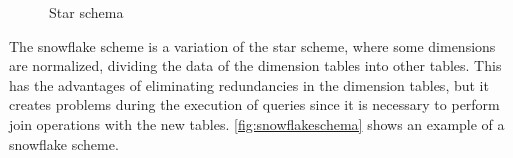 \begin{figure}[!htb]
  \caption{Star schema}\label{fig:starschema}
  \vspace{6mm}
  \begin{center}
  \end{center}
  \vspace{1mm}
  \legenda{}
\end{figure}

The snowflake scheme is a variation of the star scheme, where some dimensions are normalized, dividing the data of the dimension tables into other tables.
This has the advantages of eliminating redundancies in the dimension tables, but it creates problems during the execution of queries since it is necessary to perform join operations with the new tables.
\autoref{fig:snowflakeschema} shows an example of a snowflake scheme.

